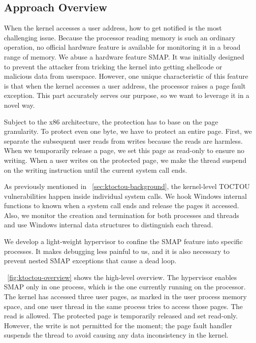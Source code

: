 \subsection{Approach Overview}


When the kernel accesses a user address, how to get notified is the most challenging issue. Because the processor reading memory is such an ordinary operation, no official hardware feature is available for monitoring it in a broad range of memory. We abuse a hardware feature SMAP. It was initially designed to prevent the attacker from tricking the kernel into getting shellcode or malicious data from userspace. However, one unique characteristic of this feature is that when the kernel accesses a user address, the processor raises a page fault exception. This part accurately serves our purpose, so we want to leverage it in a novel way.

Subject to the x86 architecture, the protection has to base on the page granularity. To protect even one byte, we have to protect an entire page.
First, we separate the subsequent user reads from writes because the reads are harmless.  When we temporarily release a page, we set this page as read-only to ensure no writing. When a user writes on the protected page, we make the thread suspend on the writing instruction until the current system call ends.

As previously mentioned in ~\autoref{sec:ktoctou-background}, the kernel-level TOCTOU vulnerabilities happen inside individual system calls. We hook Windows internal functions to known when a system call ends and release the pages it accessed. Also, we monitor the creation and termination for both processes and threads and use Windows internal data structures to distinguish each thread.

We develop a light-weight hypervisor to confine the SMAP feature into specific processes. It makes debugging less painful to us, and it is also necessary to prevent nested SMAP exceptions that cause a dead loop.

~\autoref{fig:ktoctou-overview} shows the high-level overview. The hypervisor enables SMAP only in one process, which is the one currently running on the processor. The kernel has accessed three user pages, as marked in the user process memory space, and one user thread in the same process tries to access those pages. The read is allowed. The protected page is temporarily released and set read-only. However, the write is not permitted for the moment; the page fault handler suspends the thread to avoid causing any data inconsistency in the kernel.

